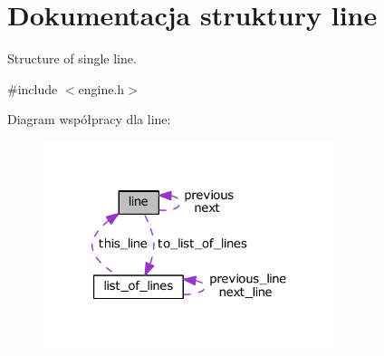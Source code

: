 \hypertarget{structline}{\section{Dokumentacja struktury line}
\label{structline}
}


Structure of single line.  




{\ttfamily \#include $<$engine.\-h$>$}



Diagram współpracy dla line\-:\nopagebreak
\begin{figure}[H]
\begin{center}
\leavevmode
\includegraphics[width=242pt]{structline__coll__graph}
\end{center}
\end{figure}
